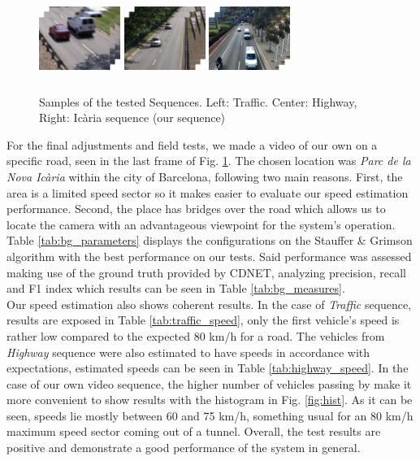 \begin{figure}[h]
\centering
\includegraphics[width=75pt, height=75pt]{figures/seq1.png}
\includegraphics[width=75pt, height=75pt]{figures/seq2.png} 
\includegraphics[width=75pt, height=75pt]{figures/seq3.png} 
\caption{Samples of the tested Sequences. Left: Traffic. Center: Highway, Right: Ic\`{a}ria sequence (our sequence)}
\label{fig:sequences}
\end{figure}
\noindent For the final adjustments and field tests, we made a video of our own on a specific road, seen in the last frame of Fig. \ref{fig:sequences}. The chosen location was \textit{Parc de la Nova Ic\`{a}ria} within the city of Barcelona, following two main reasons. First, the area is a limited speed sector so it makes easier to evaluate our speed estimation performance. Second, the place has bridges over the road which allows us to locate the camera with an advantageous viewpoint for the system's operation.\\

\noindent Table \ref{tab:bg_parameters} displays the configurations on the Stauffer \& Grimson algorithm with the best performance on our tests. Said performance was assessed making use of the ground truth provided by CDNET, analyzing precision, recall and F1 index which results can be seen in Table \ref{tab:bg_measures}.\\ 

\noindent Our speed estimation also shows coherent results. In the case of \textit{Traffic} sequence, results are exposed in Table \ref{tab:traffic_speed}, only the first vehicle's speed is rather low compared to the expected 80 km/h for a road. The vehicles from \textit{Highway} sequence were also estimated to have speeds in accordance with expectations, estimated speeds can be seen in Table \ref{tab:highway_speed}. In the case of our own video sequence, the higher number of vehicles passing by make it more convenient to show results with the histogram in Fig. \ref{fig:hist}. As it can be seen, speeds lie mostly between 60 and 75 km/h, something usual for an 80 km/h maximum speed sector coming out of a tunnel. Overall, the test results are positive and demonstrate a good performance of the system in general.  

